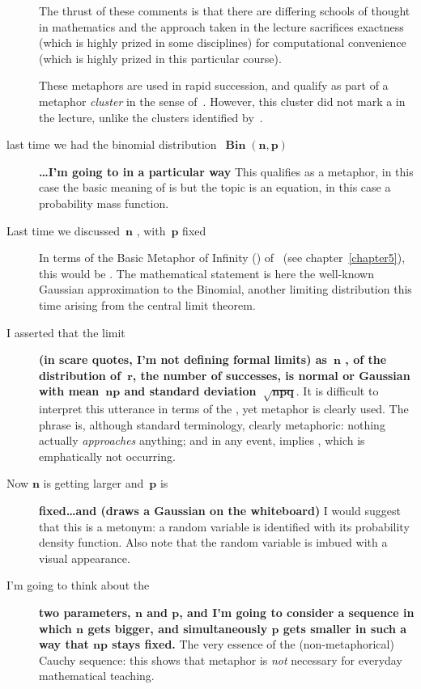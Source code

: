 \begin{description}
{  The thrust of these comments is that there are differing schools of
  thought in mathematics and the approach taken in the lecture
  sacrifices exactness (which is highly prized in some disciplines)
  for computational convenience (which is highly prized in this
  particular course).
  
  These metaphors are used in rapid succession, and qualify as part of
  a metaphor \emph{cluster} in the sense of~.  However,
  this cluster did not mark a  in the
  lecture, unlike the clusters identified by~.}
  \item[last time we had the binomial
    distribution~$\mathbf{\operatorname{\mathbf{Bin}}\left({n,p}\right)}$]
    {\bf\ldots I'm going to  in
      a particular way} This qualifies as a metaphor, in this case the
    basic meaning of  is  but the topic is
    an equation, in this case a probability mass function.

  \item[Last time we discussed~$\mathbf{n}$ \metaphor{getting larger},
    with~$\mathbf{p}$ fixed] In terms of the Basic Metaphor of
    Infinity (\bmi) of~ (see
    chapter~\ref{chapter5}), this would be .  The mathematical statement is here the well-known
    Gaussian approximation to the Binomial, another limiting
    distribution this time arising from the central limit theorem.
    
  \item[I asserted that the limit] {\bf (in scare quotes, I'm not
    defining formal limits) as~$\mathbf{n}$ , of the distribution of~$\mathbf{r}$, the number of
    successes, is normal or Gaussian with mean~$\mathbf{np}$ and
    standard deviation~$\mathbf{\sqrt{npq}}$}.  It is difficult to
    interpret this utterance in terms of the \bmi, yet metaphor is
    clearly used.  The phrase  is,
    although standard terminology, clearly metaphoric: nothing
    actually \emph{approaches} anything; and in any event,
     implies , which is emphatically not occurring.
  \item[Now $\mathbf{n}$ is getting larger and~$\mathbf{p}$ is] {\bf
    fixed\ldots and  (draws a Gaussian on
    the whiteboard)} I would suggest that this is a metonym: a random
    variable is identified with its probability density function.
    Also note that the random variable is imbued with a visual
    appearance.
  \item[I'm going to think about the] {\bf two parameters,
    $\mathbf{n}$ and $\mathbf{p}$, and I'm going to consider a
    sequence in which $\mathbf{n}$ gets bigger, and simultaneously
    $\mathbf{p}$ gets smaller in such a way that $\mathbf{np}$ stays
    fixed.} The very essence of the (non-metaphorical) Cauchy
    sequence: this shows that metaphor is \emph{not} necessary for
    everyday mathematical teaching.
\end{description}

